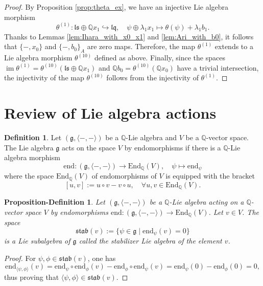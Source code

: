 \documentclass[11pt, a4paper]{amsart}
\newtheorem{propdef}[theorem]{Proposition-Definition}
\numberwithin{equation}{section}
\theoremstyle{definition}
\newtheorem{definition}[theorem]{Definition}
\newcommand{\Q}{\mathbb{Q}}
\newcommand{\ls}{\mathfrak{ls}}
\newcommand{\lqq}{\mathfrak{lq}}
\newcommand{\stab}{\mathfrak{stab}}
\begin{document}
\begin{proof} By Proposition \ref{prop:theta_ex}, we have an injective Lie algebra morphism
\[\theta^{(1)} : \ls \oplus \Q x_1 \hookrightarrow \lqq, \quad \psi \oplus \lambda_1 x_1 \mapsto \theta(\psi) + \lambda_1 b_1.\]
Thanks to Lemmas \ref{lem:Ihara_with_x0_x1} and \ref{lem:Ari_with_b0}, it follows that $\{-,x_0\}$ and $\{-,b_0\}_A$ are zero maps. Therefore, 
the map $\theta^{(1)}$ extends to a Lie algebra morphism $\theta^{(10)}$ defined as above. \newline
Finally, since the spaces $\operatorname{im} \theta^{(1)}=\theta^{(10)}(\ls\oplus \Q x_1)$ and $\Q b_0=\theta^{(10)}(\Q x_0)$ have a trivial intersection, the injectivity of the map $\theta^{(10)}$ follows from the injectivity of $\theta^{(1)}$.
\end{proof}

\appendix 

\section{Review of Lie algebra actions}

\begin{definition}
    Let $(\mathfrak{g}, \langle-,-\rangle)$ be a $\Q$-Lie algebra and $V$ be a $\Q$-vector space.
    The Lie algebra $\mathfrak{g}$ acts on the space $V$ by endomorphisms if there is a $\Q$-Lie algebra morphism
    \[
        \mathrm{end} : (\mathfrak{g}, \langle-,-\rangle) \to \mathrm{End}_\Q(V), \quad \psi \mapsto \mathrm{end}_\psi
    \]
    where the space $\mathrm{End}_\Q(V)$ of endomorphisms of $V$ is equipped with the bracket
    \[
        [u, v] := u \circ v - v \circ u, \quad \forall u, v \in \mathrm{End}_\Q(V).
    \]
\end{definition}

\begin{propdef} \label{propdef:generic_stab}
    Let $(\mathfrak{g}, \langle-,-\rangle)$ be a $\Q$-Lie algebra acting on a $\Q$-vector space $V$ by endomorphisms $\mathrm{end} : (\mathfrak{g}, \langle-,-\rangle) \to \mathrm{End}_\Q(V)$.
    Let $v \in V$. The space
    \[
        \stab(v) := \{ \psi \in \mathfrak{g} \mid \mathrm{end}_\psi(v) = 0 \}
    \]
    is a Lie subalgebra of $\mathfrak{g}$ called the \emph{stabilizer Lie algebra} of the element $v$. 
\end{propdef}
\begin{proof}
    For $\psi, \phi \in \stab(v)$, one has
    \[
        \mathrm{end}_{\langle \psi,\phi\rangle}(v) = \mathrm{end}_\psi \circ \mathrm{end}_\phi(v) - \mathrm{end}_\phi \circ \mathrm{end}_\psi(v) = \mathrm{end}_\psi(0) - \mathrm{end}_\phi(0) = 0,
    \]
    thus proving that $\langle \psi,\phi\rangle \in \stab(v)$.
\end{proof}
\end{document}

